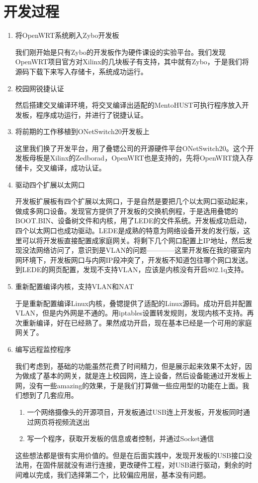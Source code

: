 \documentclass{itecreport-zh}
\begin{document}
\section{开发过程}
\begin{enumerate}
    \item 将OpenWRT系统刷入Zybo开发板


    我们刚开始是只有Zybo的开发板作为硬件课设的实验平台。我们发现OpenWRT项目官方对Xilinx的几块板子有支持，其中就有Zybo，于是我们将源码下载下来写入存储卡，系统成功运行。

    \item 校园网锐捷认证


    然后搭建交叉编译环境，将交叉编译出适配的MentoHUST可执行程序放入开发板，程序成功运行，并进行了锐捷认证。

    \item 将前期的工作移植到ONetSwitch20开发板上


    这里我们换了开发平台，用了叠锶公司的开源硬件平台ONetSwitch20。这个开发板母板是Xilinx\cite{Xilinx}的Zedborad，OpenWRT也是支持的，先将OpenWRT烧入存储卡，交叉编译，成功认证。

    \item 驱动四个扩展以太网口


    开发板扩展板有四个扩展以太网口，于是自然是要把几个以太网口驱动起来，做成多网口设备。发现官方提供了开发板的交换机例程，于是选用叠锶的BOOT.BIN、设备树文件和内核，用了LEDE\cite{LEDE}的文件系统。开发板成功启动，四个以太网口也成功驱动。LEDE是成熟的特意为网络设备开发的发行版，这里可以将开发板直接配置成家庭网关。将剩下几个网口配置上IP地址，然后发现没法网络访问了，意识到是VLAN的问题————这里开发板在我的寝室内网环境下，开发板网口与内网IP段冲突了，开发板不知道包往哪个网口发送。到LEDE的网页配置，发现不支持VLAN，应该是内核没有开启802.1q支持。

    \item 重新配置编译内核，支持VLAN和NAT


    于是重新配置编译Linux内核，叠锶提供了适配的Linux源码。成功开启并配置VLAN，但是内外网是不通的。用iptables设置转发规则，发现内核不支持。再次重新编译，好在已经熟了。果然成功开启，现在基本已经是一个可用的家庭网关了。

    \item 编写远程监控程序


    我们考虑到，基础的功能虽然花费了时间精力，但是展示起来效果不太好，因为做成了基本的网关，就是连上校园网，连上设备，然后设备能通过开发板上网，没有一些amazing的效果，于是我们打算做一些应用型的功能在上面。我们想到了几套应用。
      \begin{enumerate}
        \item 一个网络摄像头的开源项目，开发板通过USB连上开发板，开发板同时通过网页将视频流送出
        \item 写一个程序，获取开发板的信息或者控制，并通过Socket通信\cite{TCP}
      \end{enumerate}
      这些想法都是很有实用价值的。但是在后面实践中，发现开发板的USB接口没法用，在固件层就没有进行连接，更改硬件工程，对USB进行驱动，剩余的时间难以完成，我们选择第二个，比较偏应用层，基本没有问题。


\end{enumerate}
\end{document}

